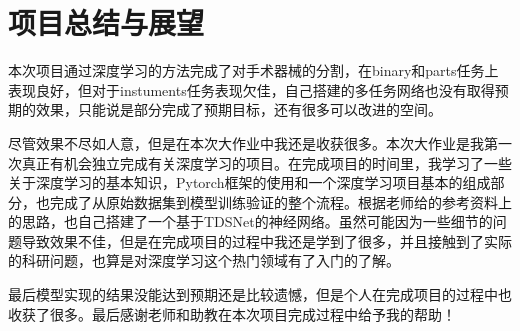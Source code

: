 \documentclass[UTF8]{ctexart}
\begin{document}
\section{项目总结与展望}
本次项目通过深度学习的方法完成了对手术器械的分割，在binary和parts任务上表现良好，但对于instuments任务表现欠佳，自己搭建的多任务网络也没有取得预期的效果，只能说是部分完成了预期目标，还有很多可以改进的空间。

尽管效果不尽如人意，但是在本次大作业中我还是收获很多。本次大作业是我第一次真正有机会独立完成有关深度学习的项目。在完成项目的时间里，我学习了一些关于深度学习的基本知识，Pytorch框架的使用和一个深度学习项目基本的组成部分，也完成了从原始数据集到模型训练验证的整个流程。根据老师给的参考资料上的思路，也自己搭建了一个基于TDSNet的神经网络。虽然可能因为一些细节的问题导致效果不佳，但是在完成项目的过程中我还是学到了很多，并且接触到了实际的科研问题，也算是对深度学习这个热门领域有了入门的了解。

最后模型实现的结果没能达到预期还是比较遗憾，但是个人在完成项目的过程中也收获了很多。最后感谢老师和助教在本次项目完成过程中给予我的帮助！



\end{document}
